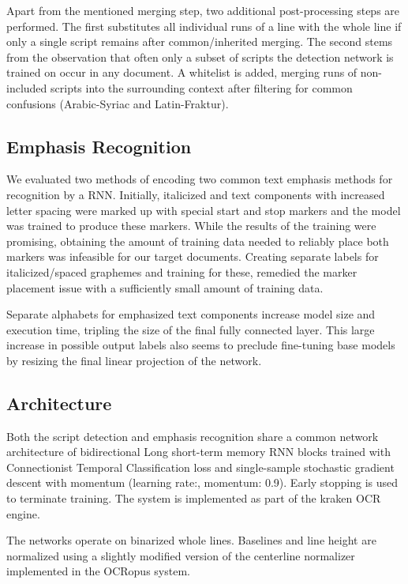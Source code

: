 Apart from the mentioned merging step, two additional post-processing steps are
performed. The first substitutes all individual runs of a line with the whole
line if only a single script remains after common/inherited merging. The second
stems from the observation that often only a subset of scripts the detection
network is trained on occur in any document. A whitelist is added, merging
runs of non-included scripts into the surrounding context after filtering for
common confusions (Arabic-Syriac and Latin-Fraktur).

\subsection{Emphasis Recognition}
\label{sec:emph}

We evaluated two methods of encoding two common text emphasis methods for
recognition by a RNN. Initially, italicized and text components with increased
letter spacing were marked up with special start and stop markers and the model
was trained to produce these markers. While the results of the training were
promising, obtaining the amount of training data needed to reliably place both
markers was infeasible for our target documents. Creating separate labels for
italicized/spaced graphemes and training for these, remedied the marker
placement issue with a sufficiently small amount of training data.

Separate alphabets for emphasized text components increase model size and
execution time, tripling the size of the final fully connected layer. This
large increase in possible output labels also seems to preclude fine-tuning
base models by resizing the final linear projection of the network.

\subsection{Architecture}

Both the script detection and emphasis recognition share a common network
architecture of bidirectional Long short-term memory RNN blocks trained with
Connectionist Temporal Classification loss and single-sample stochastic
gradient descent with momentum (learning rate:, momentum: 0.9). Early stopping
is used to terminate training. The system is implemented as part of the kraken
OCR engine.

The networks operate on binarized whole lines. Baselines and line height are
normalized using a slightly modified version of the centerline normalizer
implemented in the OCRopus system.

